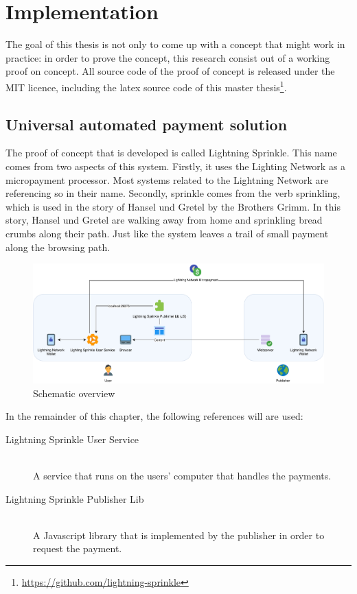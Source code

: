 \chapter{Implementation}
\label{cha:implementation}

The goal of this thesis is not only to come up with a concept that might work in practice: in order to prove the concept, this research consist out of a working proof on concept. All source code of the proof of concept is released under the MIT licence, including the latex source code of this master thesis\footnote{\url{https://github.com/lightning-sprinkle}}.

\section{Universal automated payment solution}
The proof of concept that is developed is called Lightning Sprinkle. This name comes from two aspects of this system. Firstly, it uses the Lighting Network as a micropayment processor. Most systems related to the Lightning Network are referencing so in their name. Secondly, sprinkle comes from the verb sprinkling, which is used in the story of Hansel und Gretel by the Brothers Grimm. In this story, Hansel und Gretel are walking away from home and sprinkling bread crumbs along their path. Just like the system leaves a trail of small payment along the browsing path.
\begin{figure}[h!]
  \includegraphics[width=\textwidth]{images/implementation.pdf}
  \caption{Schematic overview}
\end{figure}
In the remainder of this chapter, the following references will are used:

\begin{description}
  \item[Lightning Sprinkle User Service] \hfill \\ A service that runs on the users' computer that handles the payments.
  \item[Lightning Sprinkle Publisher Lib] \hfill \\ A Javascript library that is implemented by the publisher in order to request the payment.
\end{description} 

